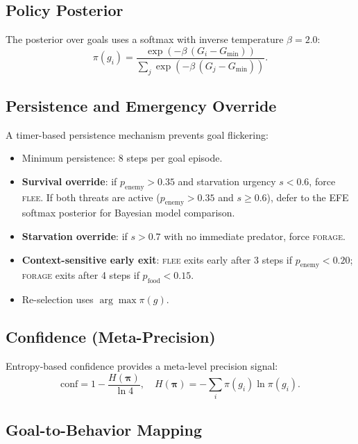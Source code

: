 \documentclass[11pt,a4paper]{article}
\begin{document}
\subsection{Policy Posterior}

The posterior over goals uses a softmax with inverse temperature $\beta = 2.0$:
\begin{equation}\label{eq:posterior}
  \pi(g_i) = \frac{\exp(-\beta\,(G_i - G_\text{min}))}
                   {\sum_j \exp(-\beta\,(G_j - G_\text{min}))}.
\end{equation}

\subsection{Persistence and Emergency Override}

A timer-based persistence mechanism prevents goal flickering:
\begin{itemize}[nosep]
  \item Minimum persistence: 8 steps per goal episode.
  \item \textbf{Survival override}: if $p_\text{enemy} > 0.35$ and
    starvation urgency $s < 0.6$, force \textsc{flee}.
    If both threats are active ($p_\text{enemy} > 0.35$ and $s \geq 0.6$),
    defer to the EFE softmax posterior for Bayesian model comparison.
  \item \textbf{Starvation override}: if $s > 0.7$ with no immediate
    predator, force \textsc{forage}.
  \item \textbf{Context-sensitive early exit}: \textsc{flee} exits early after
    3 steps if $p_\text{enemy} < 0.20$; \textsc{forage} exits after 4 steps if
    $p_\text{food} < 0.15$.
  \item Re-selection uses $\arg\max \pi(g)$.
\end{itemize}

\subsection{Confidence (Meta-Precision)}

Entropy-based confidence provides a meta-level precision signal:
\begin{equation}\label{eq:confidence}
  \text{conf} = 1 - \frac{H(\boldsymbol{\pi})}{\ln 4},
  \quad
  H(\boldsymbol{\pi}) = -\sum_i \pi(g_i)\ln\pi(g_i).
\end{equation}

\subsection{Goal-to-Behavior Mapping}
\end{document}
